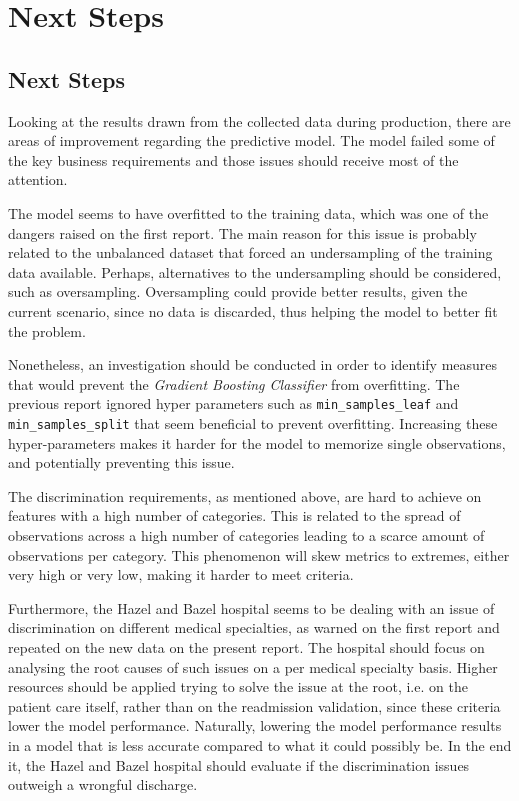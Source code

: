 \documentclass[a4paper,11pt]{article}
\begin{document}


\newpage
\section{Next Steps}
\subsection{Next Steps}

Looking at the results drawn from the collected data during production, there are areas of improvement regarding the predictive model. The model failed some of the key business requirements and those issues should receive most of the attention.

The model seems to have overfitted to the training data, which was one of the dangers raised on the first report. The main reason for this issue is probably related to the unbalanced dataset that forced an undersampling of the training data available. Perhaps, alternatives to the undersampling should be considered, such as oversampling. Oversampling could provide better results, given the current scenario, since no data is discarded, thus helping the model to better fit the problem.

Nonetheless, an investigation should be conducted in order to identify measures that would prevent the \textit{Gradient Boosting Classifier} from overfitting. The previous report ignored hyper parameters such as \texttt{min\_samples\_leaf} and \texttt{min\_samples\_split} that seem beneficial to prevent overfitting. Increasing these hyper-parameters makes it harder for the model to memorize single observations, and potentially preventing this issue.

The discrimination requirements, as mentioned above, are hard to achieve on features with a high number of categories. This is related to the spread of observations across a high number of categories leading to a scarce amount of observations per category. This phenomenon will skew metrics to extremes, either very high or very low, making it harder to meet criteria.

Furthermore, the Hazel and Bazel hospital seems to be dealing with an issue of discrimination on different medical specialties, as warned on the first report and repeated on the new data on the present report. The hospital should focus on analysing the root causes of such issues on a per medical specialty basis. Higher resources should be applied trying to solve the issue at the root, i.e. on the patient care itself, rather than on the readmission validation, since these criteria lower the model performance. Naturally, lowering the model performance results in a model that is less accurate compared to what it could possibly be. 
In the end it, the Hazel and Bazel hospital should evaluate if the discrimination issues outweigh a wrongful discharge.
\end{document}
